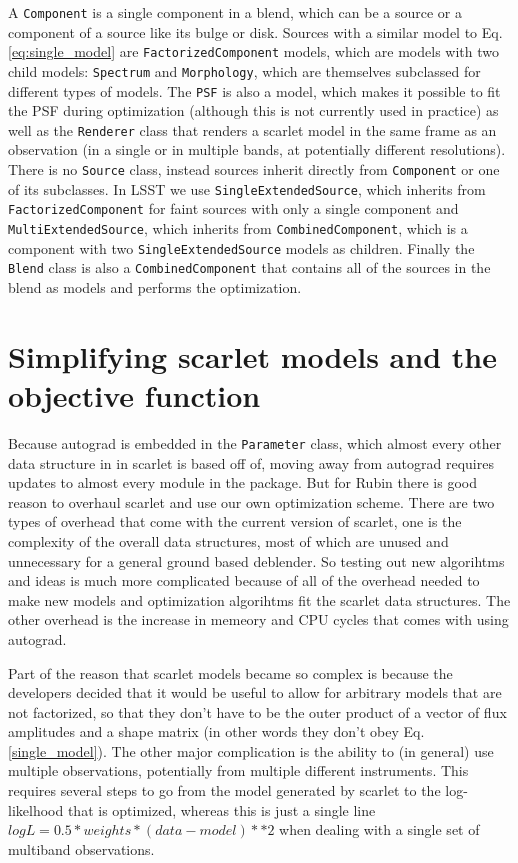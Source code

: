 \documentclass[DM,authoryear,toc]{lsstdoc}
\begin{document}
A \texttt{Component} is a single component in a blend, which can be a source or a component of a source like its bulge or disk. Sources with a similar model to Eq. \ref{eq:single_model} are \texttt{FactorizedComponent} models, which are models with two child models: \texttt{Spectrum} and \texttt{Morphology}, which are themselves subclassed for different types of models. The \texttt{PSF} is also a model, which makes it possible to fit the PSF during optimization (although this is not currently used in practice) as well as the \texttt{Renderer} class that renders a scarlet model in the same frame as an observation (in a single or in multiple bands, at potentially different resolutions). There is no \texttt{Source} class, instead sources inherit directly from \texttt{Component} or one of its subclasses. In LSST we use \texttt{SingleExtendedSource}, which inherits from \texttt{FactorizedComponent} for faint sources with only a single component and \texttt{MultiExtendedSource}, which inherits from \texttt{CombinedComponent}, which is a component with two \texttt{SingleExtendedSource} models as children. Finally the \texttt{Blend} class is also a \texttt{CombinedComponent} that contains all of the sources in the blend as models and performs the optimization.

\section{Simplifying scarlet models and the objective function}

Because autograd is embedded in the \texttt{Parameter} class, which almost every other data structure in in scarlet is based off of, moving away from autograd requires updates to almost every module in the package. But for Rubin there is good reason to overhaul scarlet and use our own optimization scheme. There are two types of overhead that come with the current version of scarlet, one is the complexity of the overall data structures, most of which are unused and unnecessary for a general ground based deblender. So testing out new algorihtms and ideas is much more complicated because of all of the overhead needed to make new models and optimization algorihtms fit the scarlet data structures. The other overhead is the increase in memeory and CPU cycles that comes with using autograd.

Part of the reason that scarlet models became so complex is because the developers decided that it would be useful to allow for arbitrary models that are not factorized, so that they don't have to be the outer product of a vector of flux amplitudes and a shape matrix (in other words they don't obey Eq. \ref{single_model}). The other major complication is the ability to (in general) use multiple observations, potentially from multiple different instruments. This requires several steps to go from the model generated by scarlet to the log-likelhood that is optimized, whereas this is just a single line $logL = 0.5*weights*(data-model)**2$ when dealing with a single set of multiband observations.
\end{document}
